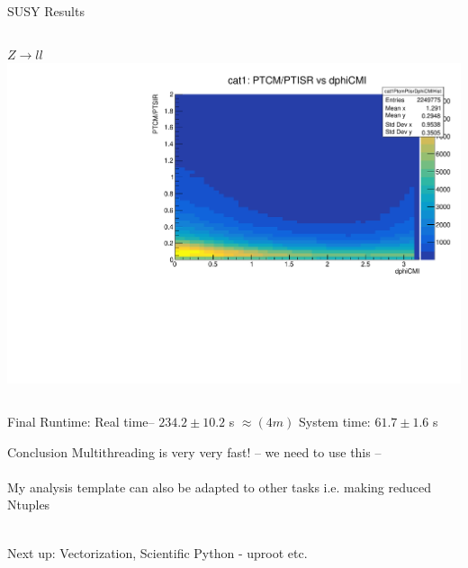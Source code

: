 \documentclass[10pt]{beamer}
\begin{document}
\begin{frame}{SUSY Results}
\begin{columns}
\begin{column}{0.5\textwidth}
			\quad \quad $Z\rightarrow ll$\\
	   		\includegraphics[scale=0.2, right]{DYdphCMI.pdf}\\
	
	\end{column}
	\end{columns}
	\scriptsize
Final Runtime: Real time-- $234.2 \pm 10.2$ s $\approx(4m)$ \quad \quad System time: $61.7 \pm 1.6$ s
\end{frame}

\begin{frame}{Conclusion}
Multithreading is very very fast! -- we need to use this --\\
\quad \quad \\
My analysis template can also be adapted to other tasks i.e. making reduced Ntuples

\quad \quad \\
Next up: Vectorization, Scientific Python - uproot etc.
\end{frame}
\end{document}
